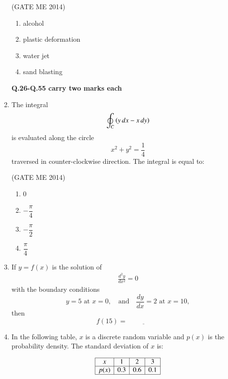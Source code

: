 \documentclass[journal]{IEEEtran}
\numberwithin{equation}{enumi}
\numberwithin{figure}{enumi}
\begin{document}
\begin{enumerate}
 \hfill{(GATE ME 2014)}
 
\begin{multicols}{4}
\begin{enumerate}
    \item alcohol
    \item plastic deformation
    \item water jet
    \item sand blasting
\end{enumerate} 
\end{multicols}
 \textbf{Q.26-Q.55 carry two marks each }

  \item The integral 
    \[
    \oint_C \left(y\,dx - x\,dy\right)
    \]
    is evaluated along the circle 
    \[
    x^2 + y^2 = \frac{1}{4}
    \]
    traversed in counter-clockwise direction. The integral is equal to:
    
 \hfill{(GATE ME 2014)}
 
    \begin{multicols}{2}
    \begin{enumerate}
        \item $0$
        \item $-\dfrac{\pi}{4}$
        \item $-\dfrac{\pi}{2}$
        \item $\dfrac{\pi}{4}$
     \end{enumerate}
    \end{multicols}

    \item If $y = f(x)$ is the solution of 
\begin{align*}
    \frac{d^2 y}{dx^2} = 0
\end{align*}
    with the boundary conditions 
    \[
    y = 5 \text{ at } x = 0, \quad \text{and} \quad \frac{dy}{dx} = 2 \text{ at } x = 10,
    \]
    then 
    \[
    f(15) = \underline{\hspace{2cm}}
    \]

    \item In the following table, $x$ is a discrete random variable and $p(x)$ is the probability density. The standard deviation of $x$ is:

    \[
    \begin{array}{|c|c|c|c|}
    \hline
    x & 1 & 2 & 3 \\
    \hline
    p(x) & 0.3 & 0.6 & 0.1 \\
    \hline
    \end{array}
    \]
    

\end{enumerate}
\end{document}
